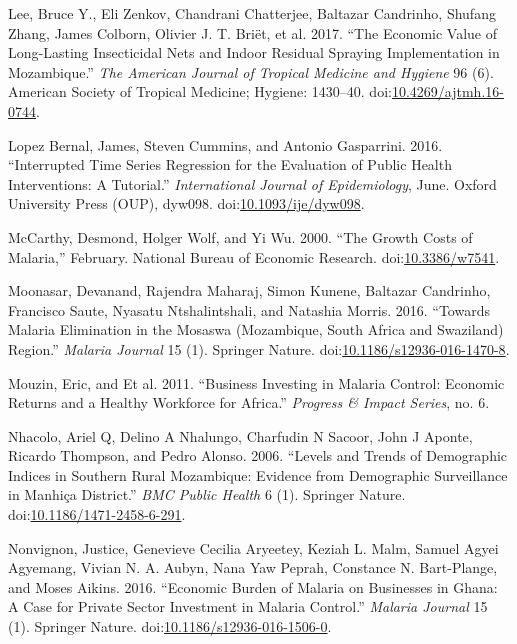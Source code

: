\documentclass[]{article}
\begin{document}
\hypertarget{ref-Lee2017}{}
Lee, Bruce Y., Eli Zenkov, Chandrani Chatterjee, Baltazar Candrinho,
Shufang Zhang, James Colborn, Olivier J. T. Briët, et al. 2017. ``The
Economic Value of Long-Lasting Insecticidal Nets and Indoor Residual
Spraying Implementation in Mozambique.'' \emph{The American Journal of
Tropical Medicine and Hygiene} 96 (6). American Society of Tropical
Medicine; Hygiene: 1430--40.
doi:\href{https://doi.org/10.4269/ajtmh.16-0744}{10.4269/ajtmh.16-0744}.

\hypertarget{ref-Lopez_Bernal_2016}{}
Lopez Bernal, James, Steven Cummins, and Antonio Gasparrini. 2016.
``Interrupted Time Series Regression for the Evaluation of Public Health
Interventions: A Tutorial.'' \emph{International Journal of
Epidemiology}, June. Oxford University Press (OUP), dyw098.
doi:\href{https://doi.org/10.1093/ije/dyw098}{10.1093/ije/dyw098}.

\hypertarget{ref-McCarthy_2000}{}
McCarthy, Desmond, Holger Wolf, and Yi Wu. 2000. ``The Growth Costs of
Malaria,'' February. National Bureau of Economic Research.
doi:\href{https://doi.org/10.3386/w7541}{10.3386/w7541}.

\hypertarget{ref-Moonasar_2016}{}
Moonasar, Devanand, Rajendra Maharaj, Simon Kunene, Baltazar Candrinho,
Francisco Saute, Nyasatu Ntshalintshali, and Natashia Morris. 2016.
``Towards Malaria Elimination in the Mosaswa (Mozambique, South Africa
and Swaziland) Region.'' \emph{Malaria Journal} 15 (1). Springer Nature.
doi:\href{https://doi.org/10.1186/s12936-016-1470-8}{10.1186/s12936-016-1470-8}.

\hypertarget{ref-Mouzin2011}{}
Mouzin, Eric, and Et al. 2011. ``Business Investing in Malaria Control:
Economic Returns and a Healthy Workforce for Africa.'' \emph{Progress \&
Impact Series}, no. 6.

\hypertarget{ref-Nhacolo_2006}{}
Nhacolo, Ariel Q, Delino A Nhalungo, Charfudin N Sacoor, John J Aponte,
Ricardo Thompson, and Pedro Alonso. 2006. ``Levels and Trends of
Demographic Indices in Southern Rural Mozambique: Evidence from
Demographic Surveillance in Manhiça District.'' \emph{BMC Public Health}
6 (1). Springer Nature.
doi:\href{https://doi.org/10.1186/1471-2458-6-291}{10.1186/1471-2458-6-291}.

\hypertarget{ref-Nonvignon_2016}{}
Nonvignon, Justice, Genevieve Cecilia Aryeetey, Keziah L. Malm, Samuel
Agyei Agyemang, Vivian N. A. Aubyn, Nana Yaw Peprah, Constance N.
Bart-Plange, and Moses Aikins. 2016. ``Economic Burden of Malaria on
Businesses in Ghana: A Case for Private Sector Investment in Malaria
Control.'' \emph{Malaria Journal} 15 (1). Springer Nature.
doi:\href{https://doi.org/10.1186/s12936-016-1506-0}{10.1186/s12936-016-1506-0}.
\end{document}
